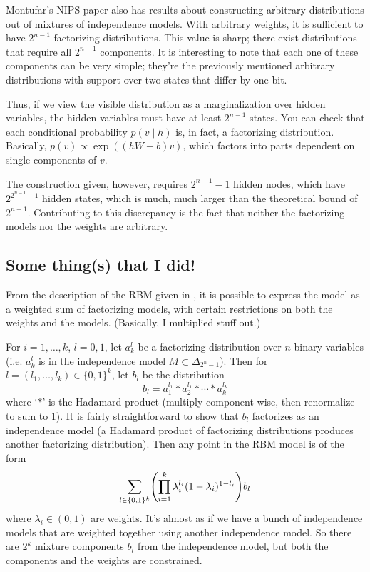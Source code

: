 \documentclass[11pt]{article}
\begin{document}
Montufar's NIPS paper also has results about constructing arbitrary
distributions out of mixtures of independence models.  With arbitrary weights,
it is sufficient to have $2^{n-1}$ factorizing distributions.  This value is
sharp; there exist distributions that require all $2^{n-1}$ components.
It is interesting to note that each one of these components can be very simple;
they're the previously mentioned arbitrary distributions with support over two
states that differ by one bit.

Thus, if we view the visible distribution as a marginalization over hidden
variables, the hidden variables must have at least $2^{n-1}$ states.  You can
check that each conditional probability $p(v \mid h)$ is, in fact, a factorizing
distribution.  Basically, $p(v) \propto \exp((hW + b)v)$, which factors into
parts dependent on single components of $v$.

The construction given, however, requires $2^{n-1} - 1$ hidden nodes, which have
$2^{2^{n-1} - 1}$ hidden states, which is much, much larger than the theoretical
bound of $2^{n-1}$.  Contributing to this discrepancy is the fact that neither
the factorizing models nor the weights are arbitrary.

\subsection{Some thing(s) that I did!}

From the description of the RBM given in \cite{CMS09}, it is possible to express
the model as a weighted sum of factorizing models, with certain restrictions on
both the weights and the models.  (Basically, I multiplied stuff out.)  

For $i = 1, \ldots, k$, $l = 0,1$, let $a_k^l$ be a factorizing distribution
over $n$ binary variables (i.e. $a_k^l$ is in the independence model $M \subset
\Delta_{2^n - 1}$).  Then for $l = (l_1, \ldots, l_k) \in \{0,1\}^k$, let $b_l$
be the distribution
\[
    b_l = a_1^{l_1} * a_2^{l_1} * \cdots * a_k^{l_k}
\]
where `$*$' is the Hadamard product (multiply component-wise, then renormalize
to sum to 1).  It is fairly straightforward to show that $b_l$ factorizes as an
independence model (a Hadamard product of factorizing distributions produces
another factorizing distribution).  Then any point in the RBM model is of the
form
\[
    \sum_{l \in \{0,1\}^k} \pdil*{\prod_{i=1}^k \lambda_i^{l_i} (1 -
    \lambda_i)^{1 - l_i}} b_l
\]
where $\lambda_i \in (0,1)$ are weights.  It's almost as if we have a bunch of
independence models that are weighted together using another independence model.
So there are $2^k$ mixture components $b_l$ from the independence model, but
both the components and the weights are constrained.
\end{document}
